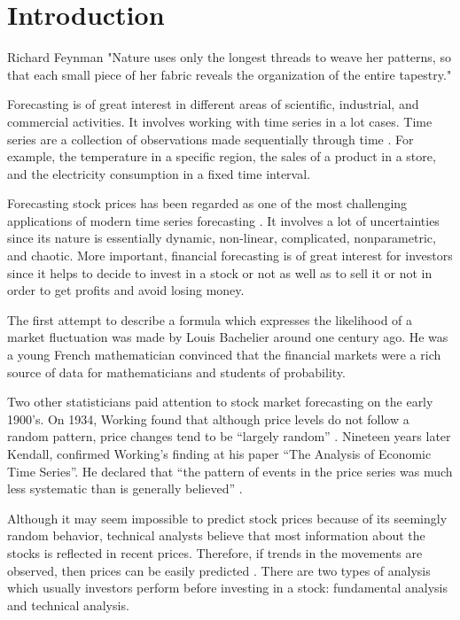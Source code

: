\chapter{Introduction}
\label{ch:introsm}
\begin{chapterquote}{Richard Feynman}
"Nature uses only the longest threads to weave her patterns, so
that each small piece of her fabric reveals the organization of
the entire tapestry."
\end{chapterquote}
Forecasting is of great interest in different areas of scientific, industrial, and commercial activities. It involves working with time series in a lot cases. Time series are a collection of observations made sequentially through time \cite{chatfield2000time}. For example, the temperature in a specific region, the sales of a product in a store, and the electricity consumption in a fixed time interval.

Forecasting stock prices has been regarded as one of the most challenging applications of modern time series forecasting \cite{pai2005hybrid}. It involves a lot of uncertainties since its nature is essentially dynamic, non-linear, complicated, nonparametric, and chaotic. More important, financial forecasting is of great interest for investors since it helps to decide to invest in a stock or not as well as to sell it or not in order to get profits and avoid losing money.

The first attempt to describe a formula which expresses the likelihood of a market fluctuation was made by Louis Bachelier around one century ago. He was a young French mathematician convinced that the financial markets were a rich source of data for mathematicians and students of probability. 

Two other statisticians paid attention to stock market forecasting on the early 1900's. On 1934, Working found that although price levels do not follow a random pattern, price changes tend to be “largely random” \cite{bernstein1993capital}. Nineteen years later Kendall, confirmed Working's finding at his paper “The Analysis of Economic Time Series”. He declared that “the pattern of events in the price series was much less systematic than is generally believed” \cite{bernstein1993capital}. 

Although it may seem impossible to predict stock prices because of its seemingly random behavior, technical analysts believe that most information about the stocks is reflected in recent prices. Therefore, if trends in the movements are observed, then prices can be easily predicted \cite{patel2015predicting}. There are two types of analysis which usually investors perform before investing in a stock: fundamental analysis and technical analysis.


